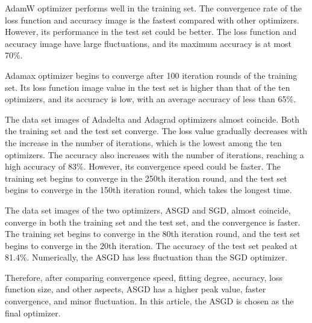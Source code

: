 \documentclass[a4paper,fleqn]{cas-sc}
\begin{document}
AdamW optimizer performs well in the training set. The convergence rate of the loss function and accuracy image is the fastest compared with other optimizers. However, its performance in the test set could be better. The loss function and accuracy image have large fluctuations, and its maximum accuracy is at most 70\%. 

Adamax optimizer begins to converge after 100 iteration rounds of the training set. Its loss function image value in the test set is higher than that of the ten optimizers, and its accuracy is low, with an average accuracy of less than 65\%. 

The data set images of Adadelta and Adagrad optimizers almost coincide. Both the training set and the test set converge. The loss value gradually decreases with the increase in the number of iterations, which is the lowest among the ten optimizers. The accuracy also increases with the number of iterations, reaching a high accuracy of 83\%. However, its convergence speed could be faster. The training set begins to converge in the 250th iteration round, and the test set begins to converge in the 150th iteration round, which takes the longest time. 

The data set images of the two optimizers, ASGD and SGD, almost coincide, converge in both the training set and the test set, and the convergence is faster. The training set begins to converge in the 80th iteration round, and the test set begins to converge in the 20th iteration. The accuracy of the test set peaked at 81.4\%. Numerically, the ASGD has less fluctuation than the SGD optimizer. 

Therefore, after comparing convergence speed, fitting degree, accuracy, loss function size, and other aspects, ASGD has a higher peak value, faster convergence, and minor fluctuation. In this article, the ASGD is chosen as the final optimizer.
\end{document}
